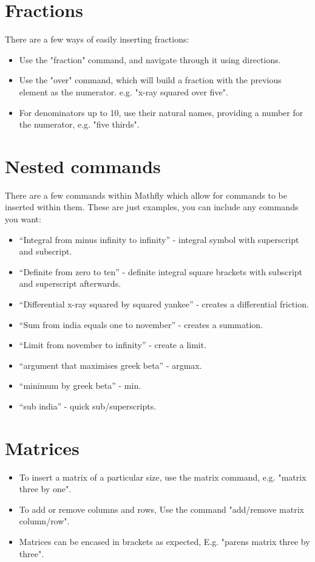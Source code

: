 \documentclass[12pt]{article}
\begin{document}
\section{Fractions}
There are a few ways of easily inserting fractions:

\begin{itemize}
\item Use the "fraction" command, and navigate through it using directions.
\item Use the "over" command, which will build a fraction with the previous element as the numerator. e.g. "x-ray squared over five".
\item For denominators up to 10, use their natural names, providing a number for the numerator, e.g. "five thirds".
\end{itemize}

\section{Nested commands}
There are a few commands within Mathfly which allow for commands to be inserted within them. These are just examples, you can include any commands you want:
\begin{itemize}
\item ``Integral from minus infinity to infinity'' - integral symbol with superscript and subscript.
\item ``Definite from zero to ten'' - definite integral square brackets with subscript and superscript afterwards.
\item ``Differential x-ray squared by squared yankee'' - creates a differential friction.
\item ``Sum from india equals one to november'' - creates a summation.
\item ``Limit from november to infinity'' - create a limit.
\item ``argument that maximises greek beta'' - argmax.
\item ``minimum by greek beta'' - min.
\item ``sub india'' - quick sub/superscripts.
\end{itemize}


\section{Matrices}
\begin{itemize}
\item To insert a matrix of a particular size, use the matrix command, e.g. "matrix three by one".
\item To add or remove columns and rows, Use the command "add/remove matrix column/row".
\item Matrices can be encased in brackets as expected, E.g. "parens matrix three by three".
\end{itemize}
\end{document}
